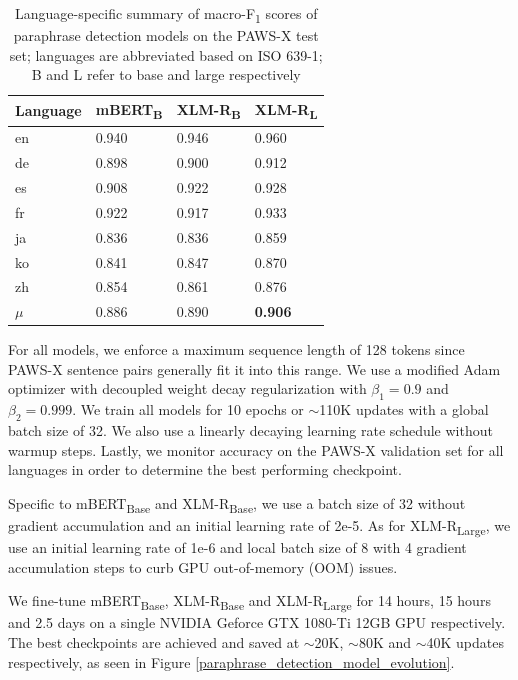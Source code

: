 \documentclass[11pt,a4paper]{article}
\begin{document}
\begin{table}
  \centering
  \begin{tabular}{llll}
    \hline
    \textbf{Language} & \textbf{mBERT\textsubscript{B}} & \textbf{XLM-R\textsubscript{B}} & \textbf{XLM-R\textsubscript{L}} \\
    \hline
    en & 0.940 & 0.946 & 0.960 \\
    de & 0.898 & 0.900 & 0.912 \\
    es & 0.908 & 0.922 & 0.928 \\
    fr & 0.922 & 0.917 & 0.933 \\
    ja & 0.836 & 0.836 & 0.859 \\
    ko & 0.841 & 0.847 & 0.870 \\
    zh & 0.854 & 0.861 & 0.876 \\
    \hline \hline
    $\mu$ & 0.886 & 0.890 & \textbf{0.906} \\
    \hline
  \end{tabular} 
  \caption{Language-specific summary of macro-F\textsubscript{1} scores of paraphrase detection models on the PAWS-X test set; languages are abbreviated based on ISO 639-1; B and L refer to base and large respectively}
  \label{pawsx_score_breakdown}
\end{table}

For all models, we enforce a maximum sequence length of 128 tokens since PAWS-X sentence pairs generally fit it into this range. We use a modified Adam optimizer with decoupled weight decay regularization \cite{DBLP:journals/corr/abs-1711-05101} with $\beta_1 = 0.9$ and $\beta_2=0.999$. We train all models for 10 epochs or $\sim$110K updates with a global batch size of 32. We also use a linearly decaying learning rate schedule without warmup steps. Lastly, we monitor accuracy on the PAWS-X validation set for all languages in order to determine the best performing checkpoint.

Specific to mBERT\textsubscript{Base} and XLM-R\textsubscript{Base}, we use a batch size of 32 without gradient accumulation and an initial learning rate of 2e-5. As for XLM-R\textsubscript{Large}, we use an initial learning rate of 1e-6 and local batch size of 8 with 4 gradient accumulation steps to curb GPU out-of-memory (OOM) issues.

We fine-tune mBERT\textsubscript{Base}, XLM-R\textsubscript{Base} and XLM-R\textsubscript{Large} for 14 hours, 15 hours and 2.5 days on a single NVIDIA Geforce GTX 1080-Ti 12GB GPU respectively. The best checkpoints are achieved and saved at $\sim$20K, $\sim$80K and $\sim$40K updates respectively, as seen in Figure \ref{paraphrase_detection_model_evolution}.
\end{document}
